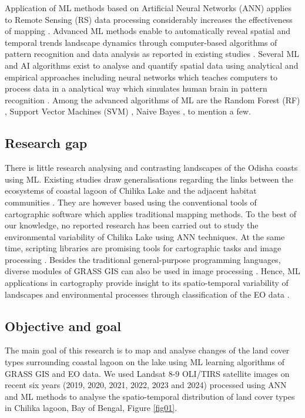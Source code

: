 \documentclass[jmse,article,submit,pdftex,moreauthors]{Definitions/mdpi}
\begin{document}
Application of ML methods based on Artificial Neural Networks (ANN) applies to Remote Sensing (RS) data processing considerably increases the effectiveness of mapping \cite{rs16010127,rs15041148}. Advanced ML methods enable to automatically reveal spatial and temporal trends landscape dynamics through computer-based algorithms of pattern recognition and data analysis as reported in existing studies \cite{AMANI2023108324,LI2023104653,Lemenkova202021,TSELKA2023131,LATIF202316}. Several ML and AI algorithms exist to analyse and quantify spatial data using analytical and empirical approaches including neural networks which teaches computers to process data in a analytical way which simulates human brain in pattern recognition \cite{HUANG2006489,Rosenblatt}. Among the advanced algorithms of ML are the Random Forest (RF) \cite{598994}, Support Vector Machines (SVM) \cite{Cortes}, Naive Bayes \cite{Zhang2004TheOO}, to mention a few. 

\subsection{Research gap}
There is little research analysing and contrasting landscapes of the Odisha coasts using ML. Existing studies draw generalisations regarding the links between the ecosystems of coastal lagoon of Chilika Lake and the adjacent habitat communities \cite{Sinha2020,BARIK2019352,MISHRA2022150769,BARAL2023103248}. They are however based using the conventional tools of cartographic software which applies traditional mapping methods. To the best of our knowledge, no reported research has been carried out to study the environmental variability of Chilika Lake using ANN techniques. At the same time, scripting libraries are promising tools for cartographic tasks and image processing \cite{9884758,Lemenkova202229,6910592,9553880,Lemenkova202227,ERDEM2021964}. Besides the traditional general-purpose programming languages, diverse modules of GRASS GIS can also be used in image processing \cite{Lemenkova202307}. Hence, ML applications in cartography provide insight to its spatio-temporal variability of landscapes and  environmental processes through classification of the EO data \cite{HAN202387,10292983,990132,WU2024103612}.  

\subsection{Objective and goal}
The main goal of this research is to map and analyse changes of the land cover types surrounding coastal lagoon on the lake using ML learning algorithms of GRASS GIS and EO data. We used Landsat 8-9 OLI/TIRS satellite images on recent six years (2019, 2020, 2021, 2022, 2023 and 2024) processed using ANN and ML methods to analyse the spatio-temporal distribution of land cover types in Chilika lagoon, Bay of Bengal, Figure \ref{fig01}. 
\end{document}
